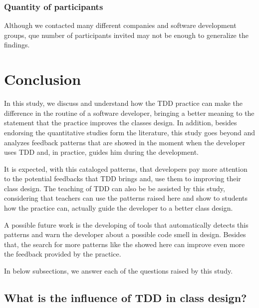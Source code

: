 \documentclass[conference]{IEEEtran}
\begin{document}
\subsubsection{Quantity of participants}

Although we contacted many different companies and software development groups,
que number of participants invited may not be enough to generalize the findings.

\section{Conclusion}


In this study, we discuss and understand how the TDD practice can make the
difference in the routine of a software developer, bringing a better meaning
to the statement that the practice improves the classes design.
In addition, besides endorsing the quantitative studies form the literature, this study
goes beyond and analyzes feedback patterns that are showed in the moment when
the developer uses TDD and, in practice, guides him during the development.

It is expected, with this cataloged patterns, that developers pay more attention
to the potential feedbacks that TDD brings and, use them to improving their class
design. The teaching of TDD can also be be assisted by this study, considering
that teachers can use the patterns raised here and show to students
how the practice can, actually guide the developer to a better class design.


A possible future work is the developing of tools that automatically detects this patterns
and warn the developer about a possible code smell in design. Besides that,
the search for more patterns like the showed here can improve even more the feedback
provided by the practice.

In below subsections, we answer each of the questions raised by this study.

\subsection{What is the influence of TDD in class design?}
\end{document}

